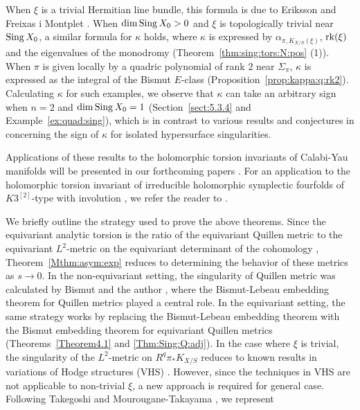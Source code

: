 \documentclass[amscd, leqno]{amsart}
\theoremstyle{plain}
\theoremstyle{definition}
\theoremstyle{remark}
\begin{document}
When $\xi$ is a trivial Hermitian line bundle, this formula is due to Eriksson and Freixas i Montplet \cite{ErikssonFreixas26}.
When $\dim {\rm Sing}\,X_{0} >0$ and $\xi$ is topologically trivial near ${\rm Sing}\,X_{0}$, 
a similar formula for $\kappa$ holds, where $\kappa$ is expressed by $\alpha_{\pi,K_{X/S}(\xi)}$, ${\rm rk}(\xi)$ and 
the eigenvalues of the monodromy (Theorem~\ref{thm:sing:tors:N:pos} (1)). 
When $\pi$ is given locally by a quadric polynomial of rank $2$ near $\Sigma_{\pi}$, $\kappa$ is expressed as
the integral of the Bismut $E$-class \cite{Bismut97} (Proposition~\ref{prop:kappa:q:rk2}). 
Calculating $\kappa$ for such examples, we observe that $\kappa$ can take an arbitrary sign when $n=2$ and $\dim {\rm Sing}\,X_{0} =1$
(Section~\ref{sect:5.3.4} and Example~\ref{ex:quad:sing}), which is in contrast to various results and conjectures in \cite{ErikssonFreixas26}
concerning the sign of $\kappa$ for isolated hypersurface singularities. 
\par
Applications of these results to the holomorphic torsion invariants of Calabi-Yau manifolds will be presented in our forthcoming papers
\cite{KawaguchiYoshikawa26, Yoshikawa26}. For an application to the holomorphic torsion invariant of irreducible holomorphic 
symplectic fourfolds of $K3^{[2]}$-type with involution \cite{Imaike25}, we refer the reader to \cite{Imaike24}.
\par
We briefly outline the strategy used to prove the above theorems.
Since the equivariant analytic torsion is the ratio of the equivariant Quillen metric to the equivariant $L^{2}$-metric on the equivariant
determinant of the cohomology \cite{BGS88, Bismut95}, Theorem~\ref{Mthm:asym:exp} reduces to determining the behavior of these metrics 
as $s \to 0$. In the non-equivariant setting, the singularity of Quillen metric was calculated by Bismut \cite{Bismut97} and 
the author \cite{Yoshikawa07}, where the Bismut-Lebeau embedding theorem for Quillen metrics \cite{BismutLebeau91}
played a central role. In the equivariant setting, the same strategy works by replacing the Bismut-Lebeau embedding theorem 
with the Bismut embedding theorem \cite{Bismut95} for equivariant Quillen metrics (Theorems~\ref{Theorem4.1} and \ref{Thm:Sing:Q:adj}).
In the case where $\xi$ is trivial, the singularity of the $L^{2}$-metric on $R^{q}\pi_{*}K_{X/S}$ reduces to known results 
in variations of Hodge structures (VHS) \cite{Schmid73, EFM21}. However, since the techniques in VHS are not applicable to non-trivial $\xi$, 
a new approach is required for general case. 
Following Takegoshi \cite{Takegoshi95} and Mourougane-Takayama \cite{MourouganeTakayama09}, we represent 
\end{document}
